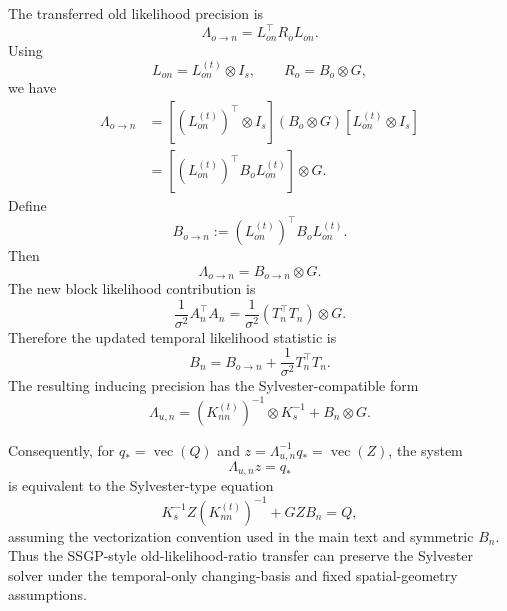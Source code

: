 \documentclass[12pt]{article}
\newcommand{\vecop}{\operatorname{vec}}
\begin{document}
The transferred old likelihood precision is
\begin{equation}
    \Lambda_{o\rightarrow n}
    =
    L_{on}^\top R_oL_{on}.
\end{equation}
Using
\begin{equation}
    L_{on}=L_{on}^{(t)}\otimes I_s,
    \qquad
    R_o=B_o\otimes G,
\end{equation}
we have
\begin{align}
    \Lambda_{o\rightarrow n}
    &=
    \left[
        \left(L_{on}^{(t)}\right)^\top\otimes I_s
    \right]
    (B_o\otimes G)
    \left[
        L_{on}^{(t)}\otimes I_s
    \right]                                                     \\
    &=
    \left[
        \left(L_{on}^{(t)}\right)^\top
        B_o
        L_{on}^{(t)}
    \right]
    \otimes G.
\end{align}
Define
\begin{equation}
    B_{o\rightarrow n}
    :=
    \left(L_{on}^{(t)}\right)^\top
    B_o
    L_{on}^{(t)}.
\end{equation}
Then
\begin{equation}
    \Lambda_{o\rightarrow n}
    =
    B_{o\rightarrow n}\otimes G.
    \label{eq:app_Lambda_transfer_kron}
\end{equation}
The new block likelihood contribution is
\begin{equation}
    \frac{1}{\sigma^2}A_n^\top A_n
    =
    \frac{1}{\sigma^2}
    (T_n^\top T_n)\otimes G.
\end{equation}
Therefore the updated temporal likelihood statistic is
\begin{equation}
    B_n
    =
    B_{o\rightarrow n}
    +
    \frac{1}{\sigma^2}T_n^\top T_n.
    \label{eq:app_Bn_after_transfer}
\end{equation}
The resulting inducing precision has the Sylvester-compatible form
\begin{equation}
    \Lambda_{u,n}
    =
    \left(K_{nn}^{(t)}\right)^{-1}\otimes K_s^{-1}
    +
    B_n\otimes G.
    \label{eq:app_Lambda_un_sylvester_form}
\end{equation}

Consequently, for \(q_*=\vecop(Q)\) and
\(z=\Lambda_{u,n}^{-1}q_*=\vecop(Z)\), the system
\begin{equation}
    \Lambda_{u,n}z=q_*
\end{equation}
is equivalent to the Sylvester-type equation
\begin{equation}
    K_s^{-1}Z
    \left(K_{nn}^{(t)}\right)^{-1}
    +
    GZB_n
    =
    Q,
    \label{eq:app_sylvester_after_transfer}
\end{equation}
assuming the vectorization convention used in the main text and symmetric
\(B_n\). Thus the SSGP-style old-likelihood-ratio transfer can preserve
the Sylvester solver under the temporal-only changing-basis and fixed
spatial-geometry assumptions.
\end{document}
